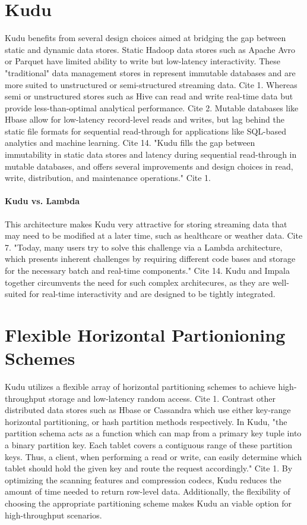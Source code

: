 \section{Kudu}
Kudu benefits from several design choices aimed at bridging the gap between static and dynamic data stores. Static Hadoop data stores such as Apache Avro or Parquet have limited ability to write but low-latency interactivity. These "traditional" data management stores in represent immutable databases and are more suited to unstructured or semi-structured streaming data. Cite 1. Whereas semi or unstructured stores such as Hive can read and write real-time data but provide less-than-optimal analytical performance. Cite 2. Mutable databases like Hbase allow for low-latency record-level reads and writes, but lag behind the static file formats for sequential read-through for applications like SQL-based analytics and machine learning.  Cite 14. "Kudu fills the gap between immutability in static data stores and latency during sequential read-through in mutable databases, and offers several improvements and design choices in read, write, distribution, and maintenance operations."  Cite 1.

\paragraph{Kudu vs. Lambda}
This architecture makes Kudu very attractive for storing streaming data that may need to be modified at a later time, such as healthcare or weather data. Cite 7. "Today, many users try to solve this challenge via a Lambda architecture, which presents inherent challenges by requiring different code bases and storage for the necessary batch and real-time components." Cite 14. Kudu and Impala together circumvents the need for such complex architecures, as they are well-suited for real-time interactivity and are designed to be tightly integrated.  

\section{Flexible Horizontal Partionioning Schemes}
Kudu utilizes a flexible array of horizontal partitioning schemes to achieve high-throughput storage and low-latency random access. Cite 1. Contrast other distributed data stores such as Hbase or Cassandra which use either key-range horizontal partitioning, or hash partition methods respectively. In Kudu, "the partition schema acts as a function which can map from a primary key tuple into a binary partition key.  Each tablet covers a contiguous  range  of  these partition keys. Thus,  a client, when performing a read or write, can easily determine which tablet should hold the given key and route the request accordingly." Cite 1. By optimizing the scanning features and compression codecs, Kudu reduces the amount of time needed to return row-level data. Additionally, the flexibility of choosing the appropriate partitioning scheme makes Kudu an viable option for high-throughput scenarios. 

